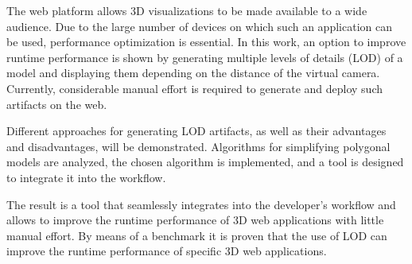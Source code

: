 The web platform allows 3D visualizations to be made available to a wide audience. Due to the large number of devices on which such an application can be used, performance optimization is essential. In this work, an option to improve runtime performance is shown by generating multiple levels of details (LOD) of a model and displaying them depending on the distance of the virtual camera. Currently, considerable manual effort is required to generate and deploy such artifacts on the web.

\bigbreak
Different approaches for generating LOD artifacts, as well as their advantages and disadvantages, will be demonstrated.
Algorithms for simplifying polygonal models are analyzed, the chosen algorithm is implemented, and a tool is designed to integrate it into the workflow.

\bigbreak
The result is a tool that seamlessly integrates into the developer's workflow and allows to improve the runtime performance of 3D web applications with little manual effort.
By means of a benchmark it is proven that the use of LOD can improve the runtime performance of specific 3D web applications.
